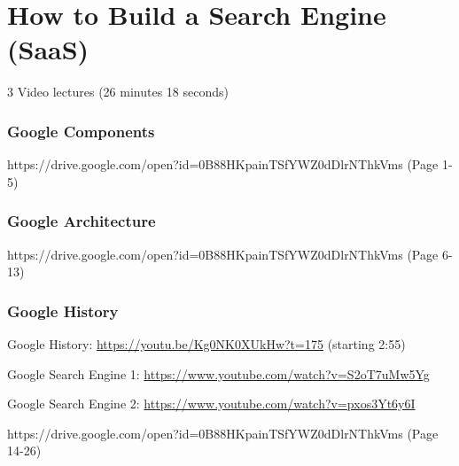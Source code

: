 \part{How to Build a Search Engine
(SaaS)}

  3 Video lectures (26 minutes 18 seconds)

\section{Google Components}


{https://drive.google.com/open?id=0B88HKpainTSfYWZ0dDlrNThkVms
  (Page 1-5)}

\section{Google Architecture}


{https://drive.google.com/open?id=0B88HKpainTSfYWZ0dDlrNThkVms
  (Page 6-13)}

\section{Google History}

  Google History: \url{https://youtu.be/Kg0NK0XUkHw?t=175}  (starting 2:55)

  Google Search Engine 1: \url{https://www.youtube.com/watch?v=S2oT7uMw5Yg}

  Google Search Engine 2: \url{https://www.youtube.com/watch?v=pxos3Yt6y6I}



{https://drive.google.com/open?id=0B88HKpainTSfYWZ0dDlrNThkVms
  (Page 14-26)}

